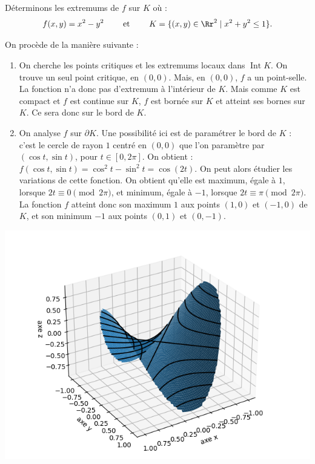 \documentclass[11pt, class=report,crop=false]{standalone}
\begin{document}
\begin{exemple}
Déterminons les extremums de $f$ sur $K$ où :
$$f(x,y) = x^2 - y^2 \qquad \text{ et } \qquad K = \lbrace (x,y) \in \Rr^2  \mid  x^2 + y^2 \leq 1 \rbrace.$$



On procède de la manière suivante :     
\begin{enumerate}
    \item On cherche les points critiques et les extremums locaux dans $\operatorname{Int} K$.
    On trouve un seul point critique, en $(0,0)$. Mais, en $(0,0)$, $f$ a un point-selle. La fonction n'a donc pas d'extremum à l'intérieur de $K$. Mais comme $K$ est compact et $f$ est continue sur $K$, $f$ est bornée sur $K$ et atteint ses bornes sur $K$. Ce sera donc sur le bord de $K$.
    
    \item On analyse $f$ sur $\partial K$.
    Une possibilité ici est de paramétrer le bord de $K$ : c'est le cercle de rayon $1$ centré en $(0,0)$ que l'on paramètre par $(\cos t,\sin t)$, pour $t\in[0,2\pi]$. On obtient :
    $f(\cos t,\sin t)=\cos^2t-\sin^2t=\cos(2t)$. On peut alors étudier les variations de cette fonction. On obtient qu'elle est maximum, égale à $1$, lorsque $2t \equiv 0 \pmod{2\pi}$, et minimum, égale à $-1$, lorsque $2t \equiv \pi \pmod{2\pi}$. La fonction $f$ atteint donc son maximum $1$ aux points $(1,0)$ et $(-1,0)$ de $K$, et son minimum $-1$ aux points $(0,1)$ et $(0,-1)$.
\end{enumerate}

\begin{center}
  \includegraphics[scale=\myscale,scale=0.6]{figures/fonctions-extrem-8}
\end{center}

\end{exemple}
\end{document}
